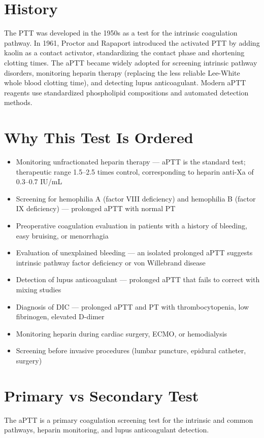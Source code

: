\section*{History}
The PTT was developed in the 1950s as a test for the intrinsic coagulation pathway. In 1961, Proctor and Rapaport introduced the activated PTT by adding kaolin as a contact activator, standardizing the contact phase and shortening clotting times. The aPTT became widely adopted for screening intrinsic pathway disorders, monitoring heparin therapy (replacing the less reliable Lee-White whole blood clotting time), and detecting lupus anticoagulant. Modern aPTT reagents use standardized phospholipid compositions and automated detection methods.

\section*{Why This Test Is Ordered}
\begin{itemize}
  \item Monitoring unfractionated heparin therapy --- aPTT is the standard test; therapeutic range 1.5--2.5 times control, corresponding to heparin anti-Xa of 0.3--0.7 IU/mL \cite{ponikowski2016esc}
  \item Screening for hemophilia A (factor VIII deficiency) and hemophilia B (factor IX deficiency) --- prolonged aPTT with normal PT
  \item Preoperative coagulation evaluation in patients with a history of bleeding, easy bruising, or menorrhagia
  \item Evaluation of unexplained bleeding --- an isolated prolonged aPTT suggests intrinsic pathway factor deficiency or von Willebrand disease
  \item Detection of lupus anticoagulant --- prolonged aPTT that fails to correct with mixing studies
  \item Diagnosis of DIC --- prolonged aPTT and PT with thrombocytopenia, low fibrinogen, elevated D-dimer
  \item Monitoring heparin during cardiac surgery, ECMO, or hemodialysis
  \item Screening before invasive procedures (lumbar puncture, epidural catheter, surgery)
\end{itemize}

\section*{Primary vs Secondary Test}
The aPTT is a primary coagulation screening test for the intrinsic and common pathways, heparin monitoring, and lupus anticoagulant detection.

